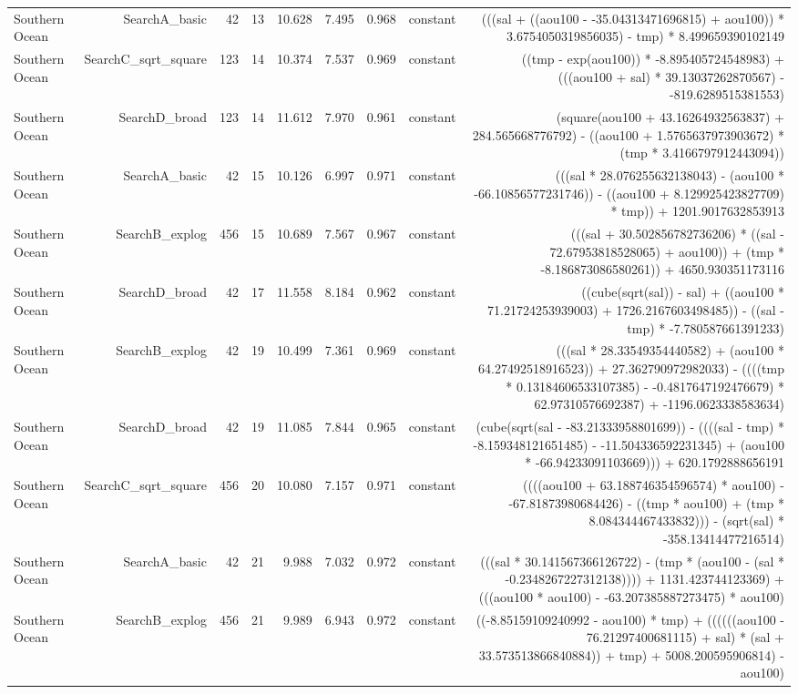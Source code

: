 \begin{table}
{\begin{tabular}{lrrrrrrrr}
Southern Ocean & SearchA\_basic & 42 & 13 & 10.628 & 7.495 & 0.968 & constant & (((sal + ((aou100 - -35.04313471696815) + aou100)) * 3.6754050319856035) - tmp) * 8.499659390102149 \\
Southern Ocean & SearchC\_sqrt\_square & 123 & 14 & 10.374 & 7.537 & 0.969 & constant & ((tmp - exp(aou100)) * -8.895405724548983) + (((aou100 + sal) * 39.13037262870567) - -819.6289515381553) \\
Southern Ocean & SearchD\_broad & 123 & 14 & 11.612 & 7.970 & 0.961 & constant & (square(aou100 + 43.16264932563837) + 284.565668776792) - ((aou100 + 1.5765637973903672) * (tmp * 3.4166797912443094)) \\
Southern Ocean & SearchA\_basic & 42 & 15 & 10.126 & 6.997 & 0.971 & constant & (((sal * 28.076255632138043) - (aou100 * -66.10856577231746)) - ((aou100 + 8.129925423827709) * tmp)) + 1201.9017632853913 \\
Southern Ocean & SearchB\_explog & 456 & 15 & 10.689 & 7.567 & 0.967 & constant & (((sal + 30.502856782736206) * ((sal - 72.67953818528065) + aou100)) + (tmp * -8.186873086580261)) + 4650.930351173116 \\
Southern Ocean & SearchD\_broad & 42 & 17 & 11.558 & 8.184 & 0.962 & constant & ((cube(sqrt(sal)) - sal) + ((aou100 * 71.21724253939003) + 1726.2167603498485)) - ((sal - tmp) * -7.780587661391233) \\
Southern Ocean & SearchB\_explog & 42 & 19 & 10.499 & 7.361 & 0.969 & constant & (((sal * 28.33549354440582) + (aou100 * 64.27492518916523)) + 27.362790972982033) - ((((tmp * 0.13184606533107385) - -0.4817647192476679) * 62.97310576692387) + -1196.0623338583634) \\
Southern Ocean & SearchD\_broad & 42 & 19 & 11.085 & 7.844 & 0.965 & constant & (cube(sqrt(sal - -83.21333958801699)) - ((((sal - tmp) * -8.159348121651485) - -11.504336592231345) + (aou100 * -66.94233091103669))) + 620.1792888656191 \\
Southern Ocean & SearchC\_sqrt\_square & 456 & 20 & 10.080 & 7.157 & 0.971 & constant & ((((aou100 + 63.188746354596574) * aou100) - -67.81873980684426) - ((tmp * aou100) + (tmp * 8.084344467433832))) - (sqrt(sal) * -358.13414477216514) \\
Southern Ocean & SearchA\_basic & 42 & 21 & 9.988 & 7.032 & 0.972 & constant & (((sal * 30.141567366126722) - (tmp * (aou100 - (sal * -0.2348267227312138)))) + 1131.423744123369) + (((aou100 * aou100) - -63.207385887273475) * aou100) \\
Southern Ocean & SearchB\_explog & 456 & 21 & 9.989 & 6.943 & 0.972 & constant & ((-8.85159109240992 - aou100) * tmp) + ((((((aou100 - 76.21297400681115) + sal) * (sal + 33.573513866840884)) + tmp) + 5008.200595906814) - aou100) \\
\bottomrule
\end{tabular}%
}
\end{table}
